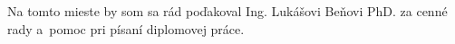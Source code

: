 Na tomto mieste by som sa rád poďakoval
Ing. Lukášovi Beňovi PhD. za cenné rady
a~pomoc pri písaní diplomovej práce.

